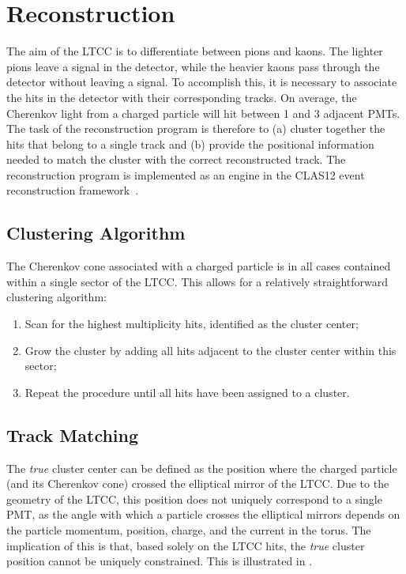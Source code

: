 \section{Reconstruction}

The aim of the LTCC is to differentiate between pions and kaons. The lighter pions
leave a signal in the detector, while the heavier kaons pass through the detector without
leaving a signal. To accomplish this, it is necessary to associate the hits in the detector with their
corresponding tracks.
On average, the Cherenkov light from a charged particle will hit between 1 and 3
adjacent PMTs.
The task of the reconstruction program is therefore to (a) cluster together the hits that
belong to a single track and (b) provide the positional information needed to match the
cluster with the correct reconstructed track. The reconstruction program is implemented as an engine in the
CLAS12 event reconstruction framework~\cite{recon-nim}.

\subsection{Clustering Algorithm}

The Cherenkov cone associated with a charged particle is in all cases contained within a
single sector of the LTCC. This allows for a relatively straightforward clustering
algorithm:
\begin{enumerate}
	\item Scan for the highest multiplicity hits, identified as the cluster center;
    \item Grow the cluster by adding all hits adjacent to the cluster center within this
      sector;
    \item Repeat the procedure until all hits have been assigned to a cluster.
\end{enumerate}

\subsection{Track Matching}

The \textit{true} cluster center can be defined as the position where the charged particle
(and its Cherenkov cone) crossed the elliptical mirror of the LTCC.
Due to the geometry of the LTCC, this position does not uniquely correspond to a single
PMT, as the angle with which a particle crosses the elliptical mirrors depends on the
particle momentum, position, charge, and the current in the torus.
The implication of this is that, based solely on the LTCC hits, the \textit{true} cluster
position cannot be uniquely constrained.
This is illustrated in .

